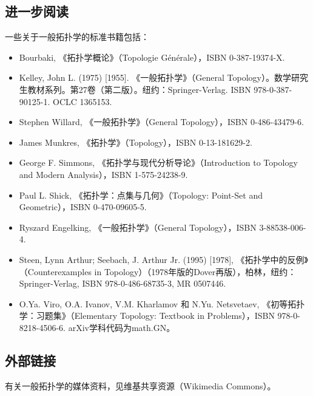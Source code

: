 \subsection{进一步阅读}
一些关于一般拓扑学的标准书籍包括：
\begin{itemize}
\item Bourbaki, 《拓扑学概论》（Topologie Générale），ISBN 0-387-19374-X.
\item Kelley, John L. (1975) [1955]. 《一般拓扑学》（General Topology）。数学研究生教材系列。第27卷（第二版）。纽约：Springer-Verlag. ISBN 978-0-387-90125-1. OCLC 1365153.
\item Stephen Willard, 《一般拓扑学》（General Topology），ISBN 0-486-43479-6.
\item James Munkres, 《拓扑学》（Topology），ISBN 0-13-181629-2.
\item George F. Simmons, 《拓扑学与现代分析导论》（Introduction to Topology and Modern Analysis），ISBN 1-575-24238-9.
\item Paul L. Shick, 《拓扑学：点集与几何》（Topology: Point-Set and Geometric），ISBN 0-470-09605-5.
\item Ryszard Engelking, 《一般拓扑学》（General Topology），ISBN 3-88538-006-4.
\item Steen, Lynn Arthur; Seebach, J. Arthur Jr. (1995) [1978], 《拓扑学中的反例》（Counterexamples in Topology）（1978年版的Dover再版），柏林，纽约：Springer-Verlag, ISBN 978-0-486-68735-3, MR 0507446.
\item O.Ya. Viro, O.A. Ivanov, V.M. Kharlamov 和 N.Yu. Netsvetaev, 《初等拓扑学：习题集》（Elementary Topology: Textbook in Problems），ISBN 978-0-8218-4506-6.
arXiv学科代码为math.GN。
\end{itemize}
\subsection{外部链接}
有关一般拓扑学的媒体资料，见维基共享资源（Wikimedia Commons）。
